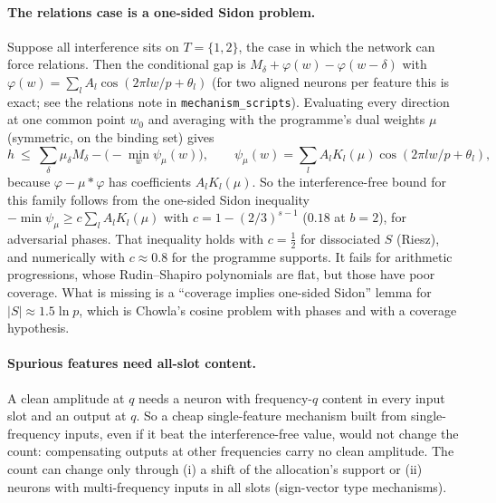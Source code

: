 \documentclass[11pt]{article}
\theoremstyle{definition}
\begin{document}
\paragraph{The relations case is a one-sided Sidon problem.}  Suppose all interference sits on $T=\{1,2\}$, the case in
which the network can force relations.  Then the conditional gap is $M_\delta+\varphi(w)-\varphi(w-\delta)$ with
$\varphi(w)=\sum_lA_l\cos(2\pi lw/p+\theta_l)$ (for two aligned neurons per feature this is exact; see the relations note in
\texttt{mechanism\_scripts}).  Evaluating every direction at one common point $w_0$ and averaging with the programme's dual
weights $\mu$ (symmetric, on the binding set) gives
\[h\ \le\ \sum_\delta\mu_\delta M_\delta-\Big(-\min_{w}\psi_\mu(w)\Big),\qquad \psi_\mu(w)=\sum_lA_lK_l(\mu)\cos(2\pi lw/p+\theta_l),\]
because $\varphi-\mu\ast\varphi$ has coefficients $A_lK_l(\mu)$.  So the interference-free bound for this family follows from the
one-sided Sidon inequality $-\min\psi_\mu\ge c\sum_lA_lK_l(\mu)$ with $c=1-(2/3)^{s-1}$ ($0.18$ at $b=2$), for adversarial phases.  That
inequality holds with $c=\frac12$ for dissociated $S$ (Riesz), and numerically with $c\approx0.8$ for the programme supports.  It fails
for arithmetic progressions, whose Rudin--Shapiro polynomials are flat, but those have poor coverage.  What is missing
is a ``coverage implies one-sided Sidon'' lemma for $|S|\approx1.5\ln p$, which is Chowla's cosine problem with phases and with a
coverage hypothesis.

\paragraph{Spurious features need all-slot content.}  A clean amplitude at $q$ needs a neuron with frequency-$q$ content in
every input slot and an output at $q$.  So a cheap single-feature mechanism built from single-frequency inputs, even if it
beat the interference-free value, would not change the count: compensating outputs at other frequencies carry no clean
amplitude.  The count can change only through (i) a shift of the allocation's support or (ii) neurons with
multi-frequency inputs in all slots (sign-vector type mechanisms).
\end{document}

